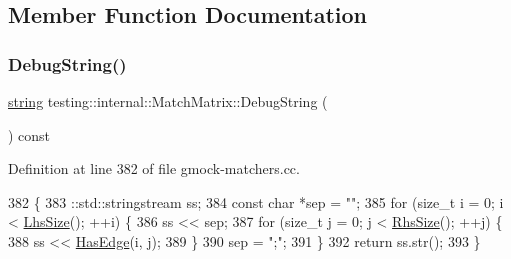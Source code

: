 \subsection{Member Function Documentation}
\mbox{\label{classtesting_1_1internal_1_1MatchMatrix_a9dc07616205c58e2747dead0a14467b2}} 
\subsubsection{\texorpdfstring{Debug\+String()}{DebugString()}}
{\footnotesize\ttfamily \hyperlink{namespacetesting_1_1internal_a8e8ff5b11e64078831112677156cb111}{string} testing\+::internal\+::\+Match\+Matrix\+::\+Debug\+String (\begin{DoxyParamCaption}{ }\end{DoxyParamCaption}) const}



Definition at line 382 of file gmock-\/matchers.\+cc.


\begin{DoxyCode}
382                                       \{
383   ::std::stringstream ss;
384   \textcolor{keyword}{const} \textcolor{keywordtype}{char} *sep = \textcolor{stringliteral}{""};
385   \textcolor{keywordflow}{for} (\textcolor{keywordtype}{size\_t} i = 0; i < \hyperlink{classtesting_1_1internal_1_1MatchMatrix_a337d9793c61d985dbc1be166e34eed61}{LhsSize}(); ++i) \{
386     ss << sep;
387     \textcolor{keywordflow}{for} (\textcolor{keywordtype}{size\_t} j = 0; j < \hyperlink{classtesting_1_1internal_1_1MatchMatrix_aff068e9fed3a42466c5da8766ac43134}{RhsSize}(); ++j) \{
388       ss << \hyperlink{classtesting_1_1internal_1_1MatchMatrix_a94c7641a932739734cb2207b1bca4036}{HasEdge}(i, j);
389     \}
390     sep = \textcolor{stringliteral}{";"};
391   \}
392   \textcolor{keywordflow}{return} ss.str();
393 \}
\end{DoxyCode}
\mbox{\label{classtesting_1_1internal_1_1MatchMatrix_a94c7641a932739734cb2207b1bca4036}} 
